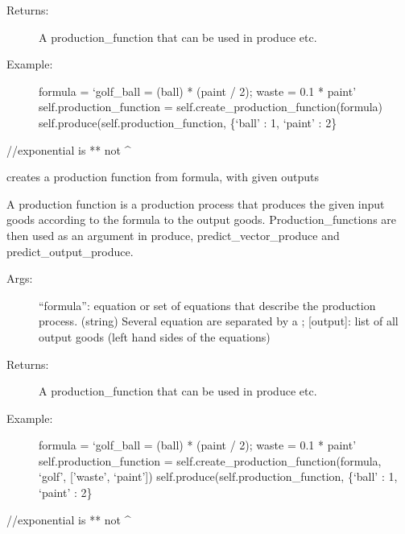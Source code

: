 \documentclass[letterpaper,10pt,english]{sphinxmanual}
\begin{document}
\begin{fulllineitems}
\begin{fulllineitems}
\begin{description}
\item[{Returns:}] \leavevmode
A production\_function that can be used in produce etc.

\item[{Example:}] \leavevmode
formula = `golf\_ball = (ball) * (paint / 2); waste = 0.1 * paint'
self.production\_function = self.create\_production\_function(formula)
self.produce(self.production\_function, \{`ball' : 1, `paint' : 2\}

\end{description}

//exponential is ** not \textasciicircum{}

\end{fulllineitems}


\begin{fulllineitems}
\label{FirmMultiTechnologies:abce.FirmMultiTechnologies.create_production_function_fast}
creates a production function from formula, with given outputs

A production function is a production process that produces the
given input goods according to the formula to the output
goods.
Production\_functions are then used as an argument in produce,
predict\_vector\_produce and predict\_output\_produce.
\begin{description}
\item[{Args:}] \leavevmode
``formula'': equation or set of equations that describe the
production process. (string) Several equation are separated by a ;
{[}output{]}: list of all output goods (left hand sides of the equations)

\item[{Returns:}] \leavevmode
A production\_function that can be used in produce etc.

\item[{Example:}] \leavevmode
formula = `golf\_ball = (ball) * (paint / 2); waste = 0.1 * paint'
self.production\_function = self.create\_production\_function(formula, `golf', {[}'waste', `paint'{]})
self.produce(self.production\_function, \{`ball' : 1, `paint' : 2\}

\end{description}

//exponential is ** not \textasciicircum{}


\end{fulllineitems}
\end{fulllineitems}
\end{document}
